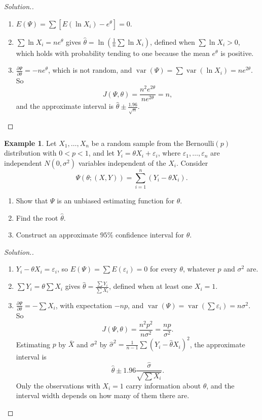 \documentclass[12pt,a4paper]{report}
\theoremstyle{definition}
\newtheorem{exa}[thm]{Example}
\DeclareMathOperator{\var}{var}
\newenvironment{solution}
  {\renewcommand{\qedsymbol}{}\begin{proof}[\textit{Solution}.]}
  {\end{proof}}
\begin{document}
\begin{solution}
\begin{enumerate}
\item[(a)] $E(\Psi) = \sum\left[E(\ln X_i) - e^\theta\right] = 0$.
\item[(b)] $\sum\ln X_i = ne^\theta$ gives $\hat\theta = \ln\left(\frac1n\sum\ln X_i\right)$,
defined when $\sum\ln X_i>0$, which holds with probability tending to one because
the mean $e^\theta$ is positive.
\item[(c)] $\frac{\partial\Psi}{\partial\theta} = -ne^\theta$, which is not random, and
$\var(\Psi) = \sum\var(\ln X_i) = ne^{2\theta}$. So
\[J(\Psi, \theta) = \frac{n^2e^{2\theta}}{ne^{2\theta}} = n,\]
and the approximate interval is $\hat\theta\pm\frac{1.96}{\sqrt n}$.
\end{enumerate}
\end{solution}

\begin{exa}
\label{ex:eeratio}
Let $X_1, \dots, X_n$ be a random sample from the Bernoulli$(p)$ distribution with
$0<p<1$, and let $Y_i = \theta X_i + \varepsilon_i$, where $\varepsilon_1, \dots, \varepsilon_n$
are independent $N(0, \sigma^2)$ variables independent of the $X_i$. Consider
\[\Psi\left(\theta; (X, Y)\right) = \sum^n_{i = 1}\left(Y_i - \theta X_i\right).\]
\begin{enumerate}
\item[(a)] Show that $\Psi$ is an unbiased estimating function for $\theta$.
\item[(b)] Find the root $\hat\theta$.
\item[(c)] Construct an approximate $95\%$ confidence interval for $\theta$.
\end{enumerate}
\end{exa}

\begin{solution}
\begin{enumerate}
\item[(a)] $Y_i - \theta X_i = \varepsilon_i$, so $E(\Psi) = \sum E(\varepsilon_i) = 0$ for every
$\theta$, whatever $p$ and $\sigma^2$ are.
\item[(b)] $\sum Y_i = \theta\sum X_i$ gives $\hat\theta = \frac{\sum Y_i}{\sum X_i}$, defined when
at least one $X_i = 1$.
\item[(c)] $\frac{\partial\Psi}{\partial\theta} = -\sum X_i$, with expectation $-np$, and
$\var(\Psi) = \var\left(\sum\varepsilon_i\right) = n\sigma^2$. So
\[J(\Psi, \theta) = \frac{n^2p^2}{n\sigma^2} = \frac{np}{\sigma^2} .\]
Estimating $p$ by $\bar X$ and $\sigma^2$ by
$\hat\sigma^2 = \frac{1}{n - 1}\sum\left(Y_i - \hat\theta X_i\right)^2$, the approximate
interval is
\[\hat\theta\pm 1.96\frac{\hat\sigma}{\sqrt{\sum X_i}} .\]
Only the observations with $X_i = 1$ carry information about $\theta$, and the
interval width depends on how many of them there are.
\end{enumerate}
\end{solution}
\end{document}
